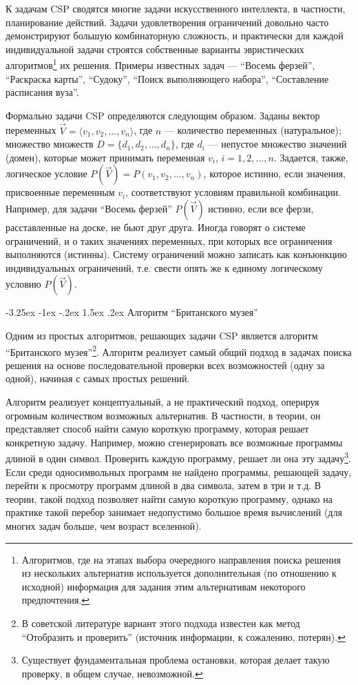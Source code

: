\documentclass[12pt, openany, twoside]{book} %
\makeatletter
\renewcommand\section{\@startsection {section}{1}{\z@}%
                                   {-3.25ex \@plus -1ex \@minus -.2ex}%
                                   {1.5ex \@plus.2ex}%
                                   {\normalfont\large\bfseries}}
\makeatother
\begin{document}
К задачам CSP сводятся многие задачи искусственного интеллекта, в частности, планирование действий. Задачи удовлетворения ограничений довольно часто демонстрируют большую комбинаторную сложность, и практически для каждой индивидуальной задачи строятся собственные варианты эвристических алгоритмов\footnote{Алгоритмов, где на этапах выбора очередного направления поиска решения из нескольких альтернатив используется дополнительная (по отношению к исходной) информация для задания этим альтернативам некоторого предпочтения.} их решения. Примеры известных задач --- ``Восемь ферзей'', ``Раскраска карты'', ``Судоку'', ``Поиск выполняющего набора'', ``Составление расписания вуза''.

Формально задачи CSP определяются следующим образом. Заданы вектор переменных $\vec{V}=\langle v_1, v_2, \ldots, v_n\rangle$, где $n$ --- количество переменных (натуральное); множество множеств $D=\{ d_1, d_2, \ldots, d_n\}$, где $d_i$ --- непустое множество значений (домен), которые может принимать переменная $v_i$, $i=1,2,\ldots,n$. Задается, также, логическое условие $P(\vec{V})=P(v_1,v_2,\ldots,v_n)$, которое истинно, если значения, присвоенные переменным $v_i$, соответствуют условиям правильной комбинации. Например, для задачи ``Восемь ферзей'' $P(\vec{V})$ истинно, если все ферзи, расставленные на доске, не бьют друг друга. Иногда говорят о системе ограничений, и о таких значениях переменных, при которых все ограничения выполняются (истинны). Систему ограничений можно записать как конъюнкцию индивидуальных ограничений, т.е. свести опять же к единому логическому условию $P(\vec{V})$.

\section{Алгоритм ``Британского музея''}

Одним из простых алгоритмов, решающих задачи CSP является алгоритм ``Британского музея''\footnote{В советской литературе вариант этого подхода известен как метод ``Отобразить и проверить'' (источник информации, к сожалению, потерян).}. Алгоритм реализует самый общий подход в задачах поиска решения на основе последовательной проверки всех возможностей (одну за одной), начиная с самых простых решений.

Алгоритм реализует концептуальный, а не практический подход, оперируя огромным количеством возможных альтернатив. В частности, в теории, он представляет способ найти самую короткую программу, которая решает конкретную задачу. Например, можно сгенерировать все возможные программы длиной в один символ. Проверить каждую программу, решает ли она эту задачу\footnote{Существует фундаментальная проблема остановки, которая делает такую проверку, в общем случае, невозможной.}. Если среди односимвольных программ не найдено программы, решающей задачу, перейти к просмотру программ длиной в два символа, затем в три и т.д. В теории, такой подход позволяет найти самую короткую программу, однако на практике такой перебор занимает недопустимо большое время вычислений (для многих задач больше, чем возраст вселенной).
\end{document}

